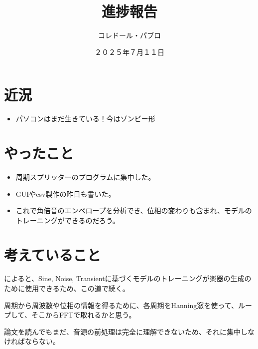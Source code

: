 \documentclass[a4paper, 12pt]{article}
\title{進捗報告}
\author{コレドール・パブロ}
\date{２０２５年７月１１日}
\begin{document}
\maketitle

\section*{近況}
\begin{itemize}
    \item パソコンはまだ生きている！今はゾンビー形
\end{itemize} 

\section*{やったこと}
\begin{itemize}
    \item 周期スプリッターのプログラムに集中した。
    \item GUIやcsv製作の昨日も書いた。
    \item これで角倍音のエンベロープを分析でき、位相の変わりも含まれ、モデルのトレーニングができるのだろう。
\end{itemize}

\section*{考えていること}

\cite{sitranoPiano}によると、Sine, Noise, Transientに基づくモデルのトレーニングが楽器の生成のために使用できるため、この道で続く。

周期から周波数や位相の情報を得るために、各周期をHanning窓を使って、ループして、そこからFFTで取れるかと思う。

論文を読んでもまだ、音源の前処理は完全に理解できないため、それに集中しなければならない。

\end{document}
